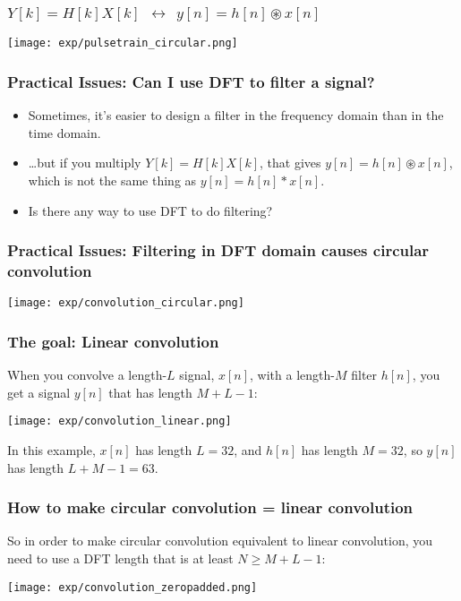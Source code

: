 \documentclass{beamer}
\begin{document}
\begin{frame}
  \frametitle{$Y[k]=H[k]X[k]~~\leftrightarrow~~y[n]=h[n]\circledast x[n]$}

  \centerline{\texttt{[image: exp/pulsetrain\_circular.png]}}
\end{frame}

\begin{frame}
  \frametitle{Practical Issues: Can I use DFT to filter a signal?}

  \begin{itemize}
  \item Sometimes, it's easier to design a filter in the frequency domain
    than in the time domain.
  \item \ldots but if you multiply $Y[k]=H[k]X[k]$, that gives
    $y[n]=h[n]\circledast x[n]$, which is not the same thing as
    $y[n]=h[n]\ast x[n]$.
  \item Is there any way to use DFT to do filtering?
  \end{itemize}
\end{frame}

\begin{frame}
  \frametitle{Practical Issues: Filtering in DFT domain causes circular convolution}

  \centerline{\texttt{[image: exp/convolution\_circular.png]}}
\end{frame}

\begin{frame}
  \frametitle{The goal: Linear convolution}

  When you convolve a length-$L$ signal, $x[n]$, with a length-$M$
  filter $h[n]$, you get a signal $y[n]$ that has length $M+L-1$:

  \centerline{\texttt{[image: exp/convolution\_linear.png]}}
  In this example, $x[n]$ has length $L=32$, and $h[n]$ has length
  $M=32$, so $y[n]$ has length $L+M-1=63$.
\end{frame}

\begin{frame}
  \frametitle{How to make circular convolution = linear convolution}

  So in order to make circular convolution equivalent to linear
  convolution, you need to use a DFT length that is at least $N\ge
  M+L-1$:

  \centerline{\texttt{[image: exp/convolution\_zeropadded.png]}}
\end{frame}
\end{document}
